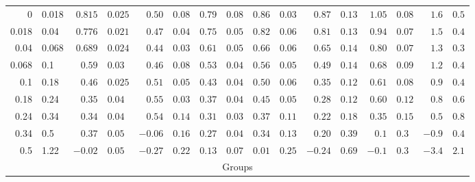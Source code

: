 \documentclass{aa}
\begin{document}
\begin{table}
\begin{centering}
{\begin{tabular}{r@{ -- }l r@{$\pm$}l r@{$\pm$}l r@{$\pm$}l r@{$\pm$}l r@{$\pm$}l r@{$\pm$}l r@{$\pm$}l}
0 & 0.018       & $0.815$ & $0.025$ & $0.50$ & $0.08$ & $0.79$ & $0.08$ & $0.86$ & $0.03$ & $0.87$ & $0.13$ & $1.05$ & $0.08$ & $1.6$ & $0.5$ \\
0.018 & 0.04 & $0.776$ & $0.021$ & $0.47$ & $0.04$ & $0.75$ & $0.05$ & $0.82$ & $0.06$ & $0.81$ & $0.13$ & $0.94$ & $0.07$ & $1.5$ & $0.4$ \\
0.04 & 0.068 & $0.689$ & $0.024$ & $0.44$ & $0.03$ & $0.61$ & $0.05$ & $0.66$ & $0.06$ & $0.65$ & $0.14$ & $0.80$ & $0.07$ & $1.3$ & $0.3$ \\
0.068 & 0.1   & $0.59$ & $0.03$ & $0.46$ & $0.08$ & $0.53$ & $0.04$ & $0.56$ & $0.05$ & $0.49$ & $0.14$ & $0.68$ & $0.09$ & $1.2$ & $0.4$ \\
0.1 & 0.18     & $0.46$ & $0.025$ & $0.51$ & $0.05$ & $0.43$ & $0.04$ & $0.50$ & $0.06$ & $0.35$ & $0.12$ & $0.61$ & $0.08$ & $0.9$ & $0.4$ \\
0.18 & 0.24   & $0.35$ & $0.04$ & $0.55$ & $0.03$ & $0.37$ & $0.04$ & $0.45$ & $0.05$ & $0.28$ & $0.12$ & $0.60$ & $0.12$ & $0.8$ & $0.6$ \\
0.24 & 0.34   & $0.34$ & $0.04$ & $0.54$ & $0.14$ & $0.31$ & $0.03$ & $0.37$ & $0.11$ & $0.22$ & $0.18$ & $0.35$ & $0.15$ & $0.5$ & $0.8$ \\
0.34 & 0.5     & $0.37$ & $0.05$ & $-0.06$ & $0.16$ & $0.27$ & $0.04$ & $0.34$ & $0.13$ & $0.20$ & $0.39$ & $0.1$ & $0.3$ & $-0.9$ & $0.4$ \\
0.5 & 1.22      & $-0.02$ & $0.05$ & $-0.27$ & $0.22$ & $0.13$ & $0.07$ & $0.01$ & $0.25$ & $-0.24$ & $0.69$ & $-0.1$ & $0.3$ & $-3.4$ & $2.1$ \\

\hline                        %
\multicolumn{16}{c}{Groups} \\
\hline


\end{tabular}}
\end{centering}
\end{table}
\end{document}
